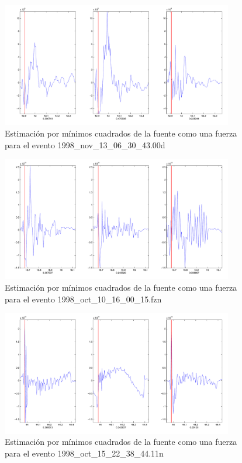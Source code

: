\begin{figure}[H]
\includegraphics[width=0.9\textwidth,height=0.4\textheight]{linea_timerev/figuras/plotSrcEv16src.pdf}
\caption{Estimación por mínimos cuadrados de la fuente como una fuerza para el
evento 1998\_nov\_13\_06\_30\_43.00d}
\end{figure}
\begin{figure}[H]
\includegraphics[width=0.9\textwidth,height=0.4\textheight]{linea_timerev/figuras/plotSrcEv17src.pdf}
\caption{Estimación por mínimos cuadrados de la fuente como una fuerza para el
evento 1998\_oct\_10\_16\_00\_15.fzn}
\end{figure}
\begin{figure}[H]
\includegraphics[width=0.9\textwidth,height=0.4\textheight]{linea_timerev/figuras/plotSrcEv18src.pdf}
\caption{Estimación por mínimos cuadrados de la fuente como una fuerza para el
evento 1998\_oct\_15\_22\_38\_44.11n}
\end{figure}
